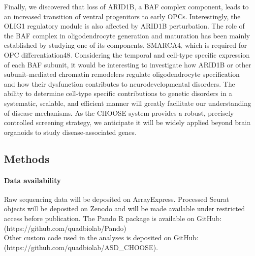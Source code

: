 Finally, we discovered that loss of ARID1B, a BAF complex component, leads to an increased transition of ventral progenitors to early OPCs.  Interestingly, the OLIG1 regulatory module is also affected by ARID1B perturbation. The role of the BAF complex in oligodendrocyte generation and maturation has been mainly established by studying one of its components, SMARCA4, which is required for OPC differentiation48. Considering the temporal and cell-type specific expression of each BAF subunit, it would be interesting to investigate how ARID1B or other subunit-mediated chromatin remodelers regulate oligodendrocyte specification and how their dysfunction contributes to neurodevelopmental disorders.
The ability to determine cell-type specific contributions to genetic disorders in a systematic, scalable, and efficient manner will greatly facilitate our understanding of disease mechanisms. As the CHOOSE system provides a robust, precisely controlled screening strategy, we anticipate it will be widely applied beyond brain organoids to study disease-associated genes. 


\subsection{Methods}

\paragraph{Data availability}
Raw sequencing data will be deposited on ArrayExpress. Processed Seurat objects will be deposited on Zenodo and will be made available under restricted access before publication. The Pando R package is available on GitHub: \\
(https://github.com/quadbiolab/Pando) \\
Other custom code used in the analyses is deposited on GitHub: \\ 
(https://github.com/quadbiolab/ASD\_CHOOSE).

